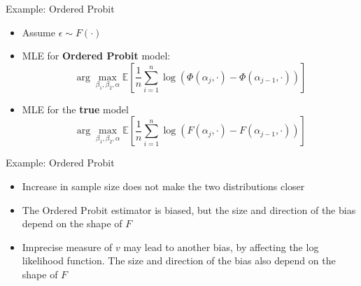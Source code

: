 \documentclass[xcolor=dvipsnames]{beamer}
\begin{document}
\begin{frame}{Example: Ordered Probit}
    \begin{itemize}
        \item Assume $\epsilon \sim F(\cdot)$
        \item MLE for \textbf{Ordered Probit} model:
            $$
            \arg\max_{\beta_{1}, \beta_{2}, \alpha} \mathbb{E}\left[\frac{1}{n} \sum_{i=1}^{n} \log \left( \Phi(\alpha_{j}, \cdot) - \Phi(\alpha_{j-1}, \cdot) \right) \right]
            $$
        \item MLE for the \textbf{true} model
            $$
                \arg\max_{\beta_{1}, \beta_{2}, \alpha} \mathbb{E}\left[\frac{1}{n} \sum_{i=1}^{n} \log \left( F(\alpha_{j}, \cdot) - F(\alpha_{j-1}, \cdot) \right) \right]
            $$ 
    \end{itemize}
\end{frame}

\begin{frame}{Example: Ordered Probit}
    \begin{itemize}
        \item Increase in sample size does not make the two distributions closer
        \item The Ordered Probit estimator is biased, but the size and direction of the bias depend on the shape of $F$
        \item Imprecise measure of $v$ may lead to another bias, by affecting the log likelihood function. The size and direction of the bias also depend on the shape of $F$
    \end{itemize}
\end{frame}
\end{document}
